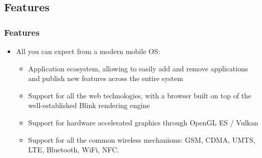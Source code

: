 \subsection{Features}
\begin{frame}
  \frametitle{Features}
  \begin{itemize}
  \item All you can expect from a modern mobile OS:
    \begin{itemize}
    \item Application ecosystem, allowing to easily add and remove
      applications and publish new features across the entire system
    \item Support for all the web technologies, with a browser built
      on top of the well-established Blink rendering engine
    \item Support for hardware accelerated graphics through OpenGL ES / Vulkan
    \item Support for all the common wireless mechanisms: GSM, CDMA,
      UMTS, LTE, Bluetooth, WiFi, NFC.
    \end{itemize}
  \end{itemize}
\end{frame}


